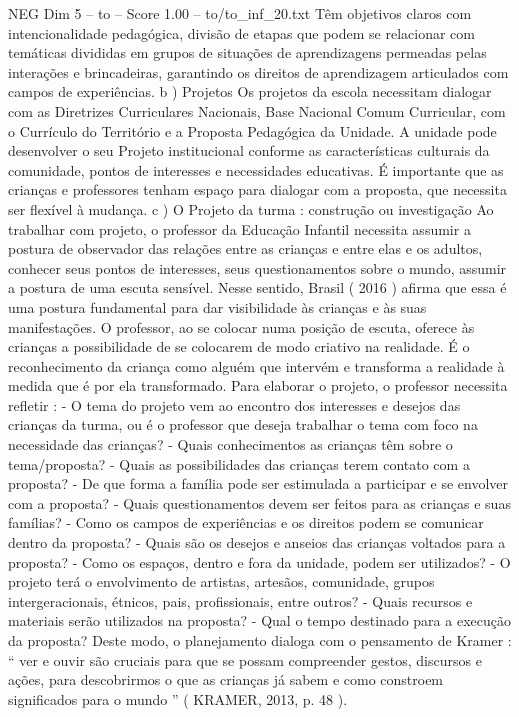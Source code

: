 \begin{textsample}{NEG Dim 5 – to – Score 1.00 – to/to\_inf\_20.txt}
Têm objetivos claros com intencionalidade pedagógica, divisão de etapas que podem se relacionar com temáticas divididas em grupos de situações de aprendizagens permeadas pelas interações e brincadeiras, garantindo os direitos de aprendizagem articulados com campos de experiências. b ) Projetos Os projetos da escola necessitam dialogar com as Diretrizes Curriculares Nacionais, Base Nacional Comum Curricular, com o Currículo do Território e a Proposta Pedagógica da Unidade.
A unidade pode desenvolver o seu Projeto institucional conforme as características culturais da comunidade, pontos de interesses e necessidades educativas.
É importante que as crianças e professores tenham espaço para dialogar com a proposta, que necessita ser flexível à mudança. c ) O Projeto da turma : construção ou investigação Ao trabalhar com projeto, o professor da Educação Infantil necessita assumir a postura de observador das relações entre as crianças e entre elas e os adultos, conhecer seus pontos de interesses, seus questionamentos sobre o mundo, assumir a postura de uma escuta sensível.
Nesse sentido, Brasil ( 2016 ) afirma que essa é uma postura fundamental para dar visibilidade às crianças e às suas manifestações.
O professor, ao se colocar numa posição de escuta, oferece às crianças a possibilidade de se colocarem de modo criativo na realidade.
É o reconhecimento da criança como alguém que intervém e transforma a realidade à medida que é por ela transformado.
Para elaborar o projeto, o professor necessita refletir : - O tema do projeto vem ao encontro dos interesses e desejos das crianças da turma, ou é o professor que deseja trabalhar o tema com foco na necessidade das crianças? - Quais conhecimentos as crianças têm sobre o tema/proposta? - Quais as possibilidades das crianças terem contato com a proposta? - De que forma a família pode ser estimulada a participar e se envolver com a proposta? - Quais questionamentos devem ser feitos para as crianças e suas famílias? - Como os campos de experiências e os direitos podem se comunicar dentro da proposta? - Quais são os desejos e anseios das crianças voltados para a proposta? - Como os espaços, dentro e fora da unidade, podem ser utilizados? - O projeto terá o envolvimento de artistas, artesãos, comunidade, grupos intergeracionais, étnicos, pais, profissionais, entre outros? - Quais recursos e materiais serão utilizados na proposta? - Qual o tempo destinado para a execução da proposta?
Deste modo, o planejamento dialoga com o pensamento de Kramer : “ ver e ouvir são cruciais para que se possam compreender gestos, discursos e ações, para descobrirmos o que as crianças já sabem e como constroem significados para o mundo ” ( KRAMER, 2013, p. 48 ).

\end{textsample}
